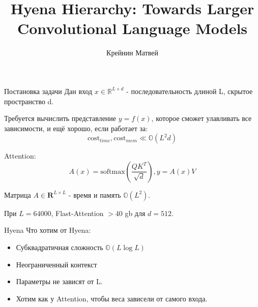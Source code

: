\documentclass[10pt]{beamer}
\title{Hyena Hierarchy: Towards Larger Convolutional Language Models}
\author{Крейнин Матвей}
\institute[MIPT]{Московский физико-технический институт \\ Кафедра интеллектуальных систем}
\date[2025]{}
\theoremstyle{definition}
\begin{document}
	
\begin{frame}[c]
	\titlepage
\end{frame}
	
\begin{frame}{Постановка задачи}
Дан вход $x \in \mathbb{R}^{L \times d}$ - последовательность длиной L, скрытое пространство d.

Требуется вычислить представление $y = f(x)$, которое сможет улавливать все зависимости, и ещё хорошо, если работает за:
\begin{equation*}
    \text{cost}_{time}, \text{cost}_{mem} \ll \mathbb{O}(L^2d)
\end{equation*}

Attention:
\begin{equation*}
    A(x) = \text{softmax}(\frac{Q K^T}{\sqrt{d}}), y = A(x)V
\end{equation*}

Матрица $A \in \mathbf{R}^{L \times L}$ - время и память $\mathbb{O}(L^2)$. 

При $L = 64000$, Flast-Attention $> 40 $ gb для $d = 512$.

\end{frame}	

\begin{frame}{Hyena}
Что хотим от Hyena:
\begin{itemize}
    \item Субквадратичная сложность $\mathbb{O}(L\log L)$
    \item Неограниченный контекст 
    \item Параметры не зависят от L.
    \item Хотим как у Attention, чтобы веса зависели от самого входа.
\end{itemize}
\end{frame}
\end{document}
